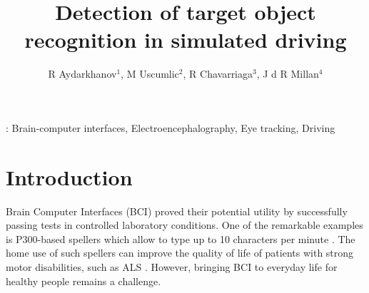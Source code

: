 \documentclass[12pt]{iopart}
\begin{document}
\title[]{Detection of target object recognition in simulated driving}

\author{R Aydarkhanov$^1$,
M Uscumlic$^2$,
R Chavarriaga$^3$,
J d R Millan$^4$}


\address{$^1$EPFL, Switzerland}
\address{$^2$EPFL, Switzerland}
\address{$^3$EPFL, Switzerland}
\address{$^4$TU Austin, USA}
\vspace{10pt}

\begin{abstract}
\end{abstract}

%
\vspace{2pc}
: Brain-computer interfaces, Electroencephalography, Eye tracking, Driving
%
%
% 
%




\section{Introduction}
\label{sec:intro}

Brain Computer Interfaces (BCI) proved their potential utility 
by successfully passing tests in controlled laboratory conditions.
One of the remarkable examples is P300-based spellers
which allow to type up to 10 characters per minute \cite{rezeika_braincomputer_2018}.
The home use of such spellers can improve the quality of life
of patients with strong motor disabilities, such as ALS \cite{sellers_brain-computer_2010,holz_long-term_2015}.
However, bringing BCI to everyday life for healthy people
remains a challenge.
\end{document}
